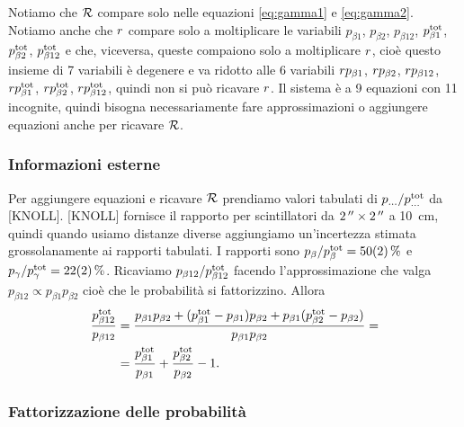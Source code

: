 Notiamo che $\Rtot$ compare solo nelle equazioni \eqref{eq:gamma1} e \eqref{eq:gamma2}.
Notiamo anche che $\R$ compare solo a moltiplicare le variabili
$p_{\beta1}$, $p_{\beta2}$, $p_{\beta12}$, $p_{\beta1}\tot$, $p_{\beta2}\tot$, $p_{\beta12}\tot$
e che, viceversa, queste compaiono solo a moltiplicare $\R$,
cioè questo insieme di 7 variabili è degenere e va ridotto alle 6 variabili
$\R p_{\beta1}$, $\R p_{\beta2}$, $\R p_{\beta12}$, $\R p_{\beta1}\tot$, $\R p_{\beta2}\tot$, $\R p_{\beta12}\tot$,
quindi non si può ricavare $\R$.
Il sistema è a 9 equazioni con 11 incognite,
quindi bisogna necessariamente fare approssimazioni o aggiungere equazioni anche per ricavare $\Rtot$.

\subsubsection{Informazioni esterne}
\label{sec:ptotp}

Per aggiungere equazioni e ricavare $\Rtot$
prendiamo valori tabulati di $p_{\dots} / p_{\dots}\tot$ da [KNOLL].
[KNOLL] fornisce il rapporto per scintillatori da $\SI{2}{''}\times\SI2{''}$ a \SI{10}{cm},
quindi quando usiamo distanze diverse aggiungiamo un'incertezza stimata grossolanamente ai rapporti tabulati.
I rapporti sono
$p_\beta / p_\beta\tot = \SI{50(2)}\%$ e
$p_\gamma / p_\gamma\tot = \SI{22(2)}\%$.
Ricaviamo $p_{\beta12} / p_{\beta12}\tot$ facendo l'approssimazione che valga
$p_{\beta12}\propto p_{\beta1}p_{\beta2}$ cioè che le probabilità si fattorizzino.
Allora
\begin{align*}
	\frac{p_{\beta12}\tot}{p_{\beta12}}
	&= \frac
	{p_{\beta1}p_{\beta2} + (p_{\beta1}\tot - p_{\beta1}) p_{\beta2} + p_{\beta1} (p_{\beta2}\tot - p_{\beta2})}
	{p_{\beta1}p_{\beta2}} = \\
	&= \frac{p_{\beta1}\tot}{p_{\beta1}} + \frac{p_{\beta2}\tot}{p_{\beta2}} - 1.
\end{align*}

\subsubsection{Fattorizzazione delle probabilità}


